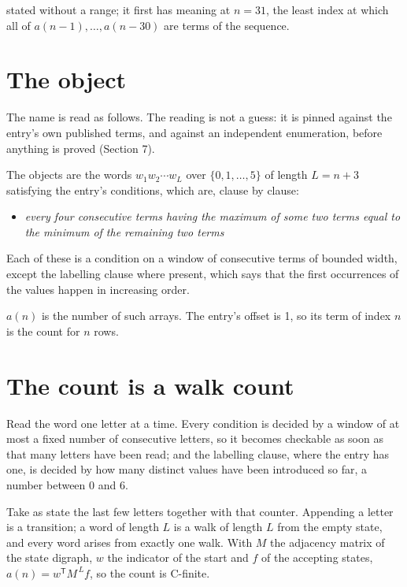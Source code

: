 \documentclass[11pt]{article}
\theoremstyle{definition}
\begin{document}
stated without a range; it first has meaning at $n = 31$, the least index at which all of $a(n-1),\dots,a(n-30)$ are terms of the sequence.

\section{The object}

The name is read as follows. The reading is not a guess: it is pinned against the entry's own published terms, and against an independent enumeration, before anything is proved (Section 7).

The objects are the words $w_1 w_2 \cdots w_L$ over $\{0,1,\dots,5\}$ of length $L = n + 3$ satisfying the entry's conditions, which are, clause by clause:

\begin{itemize}

\item {\itshape every four consecutive terms having the maximum of some two terms equal to the minimum of the remaining two terms}

\end{itemize}

Each of these is a condition on a window of consecutive terms of bounded width, except the labelling clause where present, which says that the first occurrences of the values happen in increasing order.

$a(n)$ is the number of such arrays. The entry's offset is 1, so its term of index $n$ is the count for $n$ rows.

\section{The count is a walk count}

Read the word one letter at a time. Every condition is decided by a window of at most a fixed number of consecutive letters, so it becomes checkable as soon as that many letters have been read; and the labelling clause, where the entry has one, is decided by how many distinct values have been introduced so far, a number between $0$ and 6.

Take as state the last few letters together with that counter. Appending a letter is a transition; a word of length $L$ is a walk of length $L$ from the empty state, and every word arises from exactly one walk. With $M$ the adjacency matrix of the state digraph, $w$ the indicator of the start and $f$ of the accepting states, $a(n) = w^{\mathsf T}M^{\,L}f$, so the count is C-finite.
\end{document}
